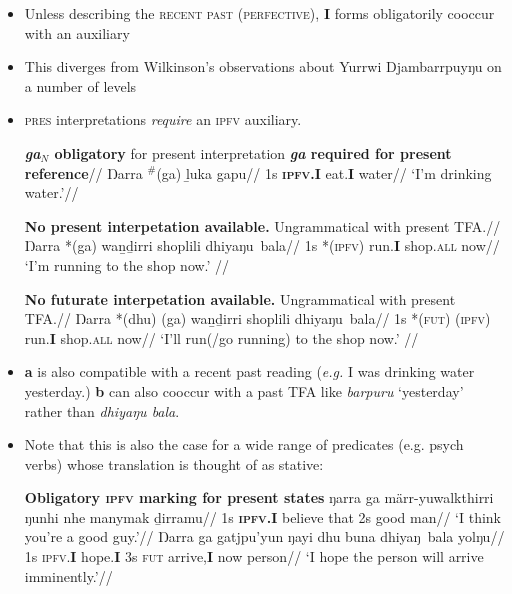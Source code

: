 \documentclass[11pt]{article}
\begin{document}
\begin{itemize}
\item Unless describing the \textsc{recent past (perfective)}, \textbf{I} forms obligatorily cooccur with an auxiliary
\item This diverges from Wilkinson's observations about Yurrwi Djambarrpuyŋu on a number of levels
\item \textsc{pres} interpretations \textit{require} an \textsc{ipfv} auxiliary.

\pex{}\textbf{\textit{ga$_{N}$} obligatory} for present interpretation
\a\begingl\glpreamble\textbf{\textit{ga} required for present reference}//
\gla Ŋarra $^{\#}$(ga) ḻuka gapu//
\glb 1s \textbf{\textsc{ipfv}.I} eat.\textbf{I} water//
\glft`I'm drinking water.'\trailingcitation{[DG20190405]}//\endgl

\a\begingl\glpreamble\textbf{No present interpetation available.} Ungrammatical with present TFA.//
\gla Ŋarra *(ga) waṉḏirri shoplili dhiyaŋu~bala//
\glb 1s *(\textsc{ipfv}) run.\textbf{I} shop.\textsc{all} now//
\glft`I'm running to the shop now.'  \trailingcitation{[DG20190405]}//\endgl

\a\begingl\glpreamble\textbf{No futurate interpetation available.} Ungrammatical with present TFA.//
\gla Ŋarra *(dhu) (ga) waṉḏirri shoplili dhiyaŋu~bala//
\glb 1s *(\textsc{fut}) (\textsc{ipfv}) run.\textbf{I} shop.\textsc{all} now//
\glft`I'll run(/go running) to the shop now.'  \trailingcitation{[DG20190405]}//\endgl
\xe


\item \textbf{a} is also compatible with a recent past reading (\textit{e.g.} I was drinking water yesterday.) \textbf{b} can also cooccur with a past TFA like \textit{barpuru} `yesterday' rather than \textit{dhiyaŋu bala}.

\item Note that this is also the case for a wide range of predicates (e.g. psych verbs) whose translation is thought of as stative:

\pex\textbf{Obligatory \textsc{ipfv} marking for present states}
\a\begingl\gla ŋarra ga märr-yuwalkthirri ŋunhi nhe manymak ḏirramu//
\glb 1s \textsc{\textbf{ipfv.I}} believe that 2s good man//
\glft`I think you're a good guy.'\trailingcitation{[DG20190517]}//\endgl
\a\begingl\gla Ŋarra ga gatjpu'yun ŋayi dhu buna dhiyaŋ~bala yolŋu//
\glb 1s \textsc{ipfv.\textbf{I}} hope.\textbf{I} 3s \textsc{fut} arrive,\textbf{I} now person//
\glft`I hope the person will arrive imminently.'\trailingcitation{[BM20190416]}//\endgl


\end{itemize}
\end{document}
